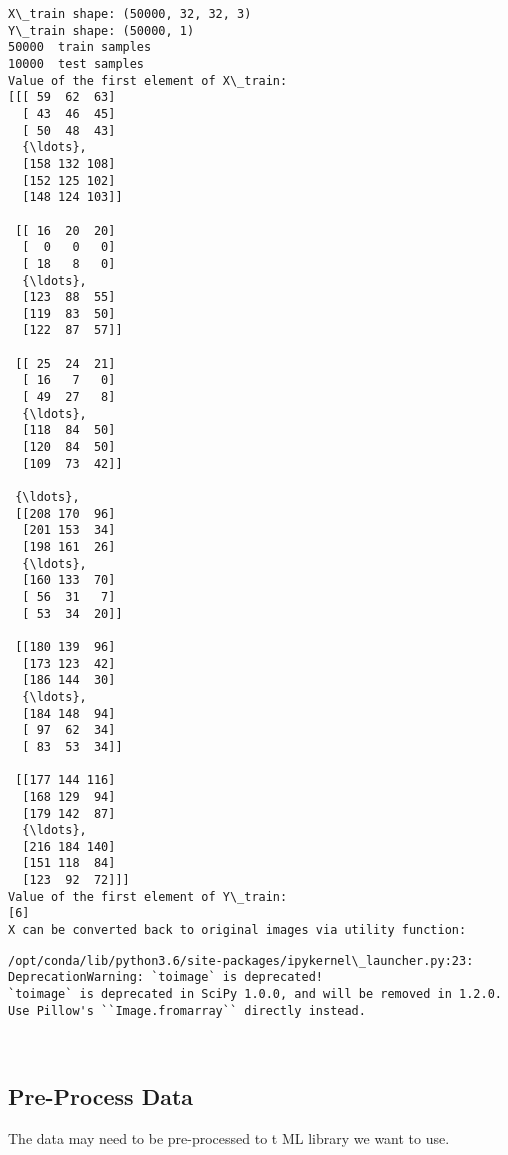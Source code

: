 \documentclass[11pt]{article}
\begin{document}
    \begin{Verbatim}[commandchars=\\\{\}]
X\_train shape: (50000, 32, 32, 3)
Y\_train shape: (50000, 1)
50000  train samples
10000  test samples
Value of the first element of X\_train:
[[[ 59  62  63]
  [ 43  46  45]
  [ 50  48  43]
  {\ldots}, 
  [158 132 108]
  [152 125 102]
  [148 124 103]]

 [[ 16  20  20]
  [  0   0   0]
  [ 18   8   0]
  {\ldots}, 
  [123  88  55]
  [119  83  50]
  [122  87  57]]

 [[ 25  24  21]
  [ 16   7   0]
  [ 49  27   8]
  {\ldots}, 
  [118  84  50]
  [120  84  50]
  [109  73  42]]

 {\ldots}, 
 [[208 170  96]
  [201 153  34]
  [198 161  26]
  {\ldots}, 
  [160 133  70]
  [ 56  31   7]
  [ 53  34  20]]

 [[180 139  96]
  [173 123  42]
  [186 144  30]
  {\ldots}, 
  [184 148  94]
  [ 97  62  34]
  [ 83  53  34]]

 [[177 144 116]
  [168 129  94]
  [179 142  87]
  {\ldots}, 
  [216 184 140]
  [151 118  84]
  [123  92  72]]]
Value of the first element of Y\_train:
[6]
X can be converted back to original images via utility function:

    \end{Verbatim}

    \begin{Verbatim}[commandchars=\\\{\}]
/opt/conda/lib/python3.6/site-packages/ipykernel\_launcher.py:23: DeprecationWarning: `toimage` is deprecated!
`toimage` is deprecated in SciPy 1.0.0, and will be removed in 1.2.0.
Use Pillow's ``Image.fromarray`` directly instead.

    \end{Verbatim}

    \begin{center}
    \end{center}
    { \hspace*{\fill} \\}
    
    \hypertarget{pre-process-data}{%
\subsection{Pre-Process Data}\label{pre-process-data}}

The data may need to be pre-processed to  t ML library we want to use.
\end{document}
